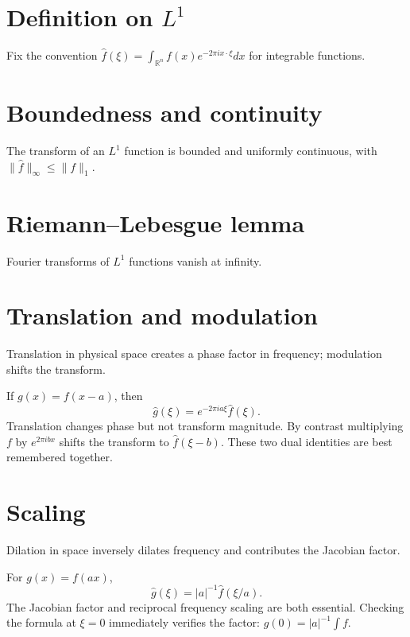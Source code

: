 \section{Definition on $L^1$}
Fix the convention $\widehat f(\xi)=\int_{\mathbb R^n}f(x)e^{-2\pi i x\cdot\xi}dx$ for integrable functions.

\section{Boundedness and continuity}
The transform of an $L^1$ function is bounded and uniformly continuous, with $\|\widehat f\|_\infty\le\|f\|_1$.

\section{Riemann--Lebesgue lemma}
Fourier transforms of $L^1$ functions vanish at infinity.

\section{Translation and modulation}
Translation in physical space creates a phase factor in frequency; modulation shifts the transform.


\begin{example}\label{ex:iii11-expand-01}
If \(g(x)=f(x-a)\), then
\[
\widehat g(\xi)=e^{-2\pi ia\xi}\widehat f(\xi).
\]
Translation changes phase but not transform magnitude. By contrast multiplying
\(f\) by \(e^{2\pi ibx}\) shifts the transform to
\(\widehat f(\xi-b)\). These two dual identities are best remembered together.
\end{example}
\section{Scaling}
Dilation in space inversely dilates frequency and contributes the Jacobian factor.


\begin{example}\label{ex:iii11-expand-02}
For \(g(x)=f(ax)\),
\[
\widehat g(\xi)=|a|^{-1}\widehat f(\xi/a).
\]
The Jacobian factor and reciprocal frequency scaling are both essential.
Checking the formula at \(\xi=0\) immediately verifies the factor:
\(\widehat g(0)=|a|^{-1}\int f\).
\end{example}
